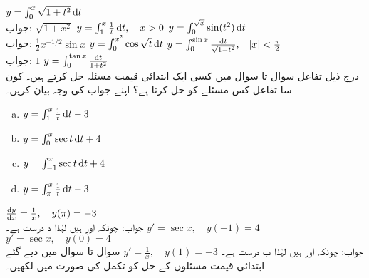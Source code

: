 $y=\int_0^x\sqrt{1+t^2}\dif t$\\
جواب:\quad
$\sqrt{1+x^2}$
$y=\int_1^x\tfrac{1}{t}\dif t,\quad x>0$
$y=\int_0^{\sqrt{x}}\sin(t^2)\dif t$\\
جواب:\quad
$\tfrac{1}{2}x^{-1/2}\sin x$
$y=\int_0^{x^2}\cos\sqrt{t}\dif t$
$y=\int_0^{\sin x}\tfrac{\dif t}{\sqrt{1-t^2}},\quad \abs{x}<\tfrac{\pi}{2}$\\
جواب:\quad
$1$
$y=\int_0^{\tan x}\tfrac{\dif t}{1+t^2}$
\\
درج ذیل تفاعل سوال  تا سوال  میں کسی ایک ابتدائی قیمت مسئلہ حل کرتے ہیں۔ کون سا تفاعل کس مسئلے کو حل کرتا ہے؟ اپنے جواب کی وجہ بیان کریں۔ 
\begin{multicols}{2}
\begin{enumerate}[a.]
\item
$y=\int_1^x\tfrac{1}{t}\dif t-3$
\item
$y=\int_0^x\sec t\dif t+4$
\item
$y=\int_{-1}^x\sec t\dif t+4$
\item
$y=\int_{\pi}^x\tfrac{1}{t}\dif t-3$
\end{enumerate}
\end{multicols}

$\tfrac{\dif y}{\dif x}=\tfrac{1}{x},\quad y(\pi)=-3$\\
جواب:\quad
چونکہ  اور  ہیں لہٰذا د درست ہے۔
$y'=\sec x,\quad y(-1)=4$
$y'=\sec x,\quad y(0)=4$\\
جواب:\quad
چونکہ  اور  ہیں لہٰذا ب درست ہے۔
$y'=\tfrac{1}{x},\quad y(1)=-3$
سوال  تا سوال  میں دیے گئے ابتدائی قیمت مسئلوں کے حل کو تکمل کی صورت میں لکھیں۔

